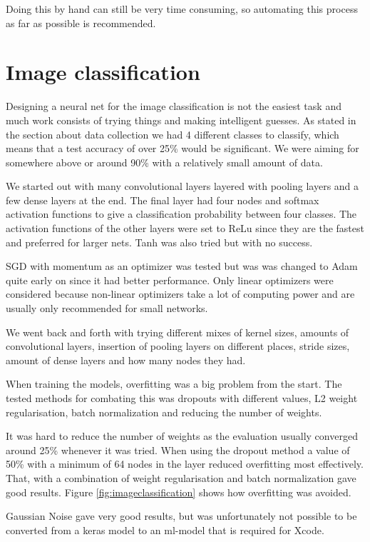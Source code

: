 Doing this by hand can still be very time consuming, so automating this process as far as possible is recommended.

\section{Image classification}
Designing a neural net for the image classification is not the easiest task and much
work consists of trying things and making intelligent guesses.
As stated in the section about data collection we had 4 different classes to classify,
which means that a test accuracy of over 25\% would be significant. We were aiming for
somewhere above or around 90\% with a relatively small amount of data.

We started out with many convolutional layers layered with pooling layers and a few dense
layers at the end. The final layer had four nodes and softmax activation functions to give a
classification probability between four classes.
The activation functions of the other layers were set to ReLu since they are the fastest
and preferred for larger nets. Tanh was also tried but with no success.

SGD with momentum as an optimizer was tested but was was changed to Adam
quite early on since it had better performance.
Only linear optimizers were considered because non-linear optimizers take a lot of
computing power and are usually only recommended for small networks.

We went back and forth with trying different mixes of kernel sizes, amounts of convolutional
layers, insertion of pooling layers on different places, stride sizes, amount of dense layers
and how many nodes they had.

When training the models, overfitting was a big problem from the start. The tested methods
for combating this was dropouts with different values, L2 weight regularisation,
batch normalization and reducing the number of weights.

It was hard to reduce the number of weights as the evaluation usually converged around 25\%
whenever it was tried.
When using the dropout method a value of 50\% with a minimum of 64 nodes in the layer
reduced overfitting most effectively. That, with a combination of weight regularisation and batch 
normalization gave good results. Figure \ref{fig:imageclassification} shows how overfitting was avoided.

Gaussian Noise gave very good results, but was unfortunately not possible to be 
converted from a keras model to an ml-model that is required for Xcode.

